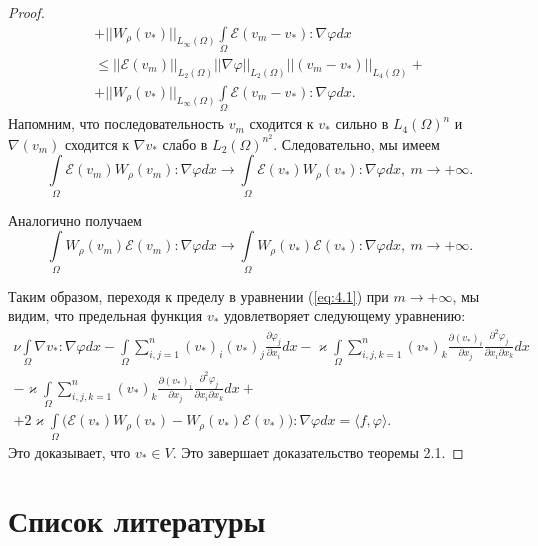 \begin{proof}
\begin{equation*}
\begin{gathered}
            + ||W_\rho(v_*)||_{L_\infty(\Omega)} \int\limits_{\Omega}\mathcal{E}(v_m - v_*): \nabla\varphi dx\\
            \leq ||\mathcal{E}(v_m)||_{L_2(\Omega)}||\nabla\varphi||_{L_2(\Omega)}||(v_m - v_*)||_{L_4(\Omega)} +\\
            + ||W_\rho(v_*)||_{L_\infty(\Omega)} \int\limits_{\Omega}\mathcal{E}(v_m - v_*): \nabla\varphi dx.
        \end{gathered}
    \end{equation*}
    Напомним, что последовательность $v_m$ сходится к $v_*$ сильно в $L_4(\Omega)^n$
    и $\nabla(v_m)$ сходится к $\nabla v_*$ слабо в $L_2(\Omega)^{n^2}$.
    Следовательно, мы имеем
    $$\int\limits_{\Omega}\mathcal{E}(v_m) W_\rho(v_m): \nabla\varphi dx \rightarrow
    \int\limits_{\Omega}\mathcal{E}(v_*) W_\rho(v_*): \nabla\varphi dx, \ m \rightarrow +\infty.$$

    Аналогично получаем
    $$\int\limits_{\Omega}W_\rho(v_m)\mathcal{E}(v_m): \nabla\varphi dx \rightarrow
    \int\limits_{\Omega}W_\rho(v_*)\mathcal{E}(v_*): \nabla\varphi dx, \ m \rightarrow +\infty.$$

    Таким образом, переходя к пределу в уравнении (\ref{eq:4.1}) при $m \rightarrow +\infty$,
    мы видим, что предельная функция $v_*$ удовлетворяет следующему уравнению:
    \begin{equation*}
        \begin{gathered}
            \nu\int\limits_{\Omega}\nabla v_*: \nabla\varphi dx -
            \int\limits_{\Omega}\sum_{i,j=1}^n (v_*)_i (v_*)_j \frac{\partial \varphi_j}{\partial x_i} dx
            - \varkappa \int\limits_{\Omega}\sum_{i,j,k=1}^n (v_*)_k \frac{\partial (v_*)_i}{\partial x_j}
            \frac{\partial^2 \varphi_j}{\partial x_i \partial x_k} dx \\
            - \varkappa \int\limits_{\Omega}\sum_{i,j,k=1}^n (v_*)_k \frac{\partial (v_*)_i}{\partial x_j}
            \frac{\partial^2 \varphi_j}{\partial x_i \partial x_k} dx + \\ + 2 \varkappa
            \int\limits_{\Omega}\bigg(\mathcal{E}(v_*) W_\rho(v_*) - W_\rho(v_*)\mathcal{E}(v_*)\bigg): \nabla\varphi dx = \langle f, \varphi \rangle.
        \end{gathered}
    \end{equation*}
    Это доказывает, что $v_* \in V$. Это завершает доказательство теоремы 2.1.
\end{proof}

\clearpage
\section{Список литературы}


